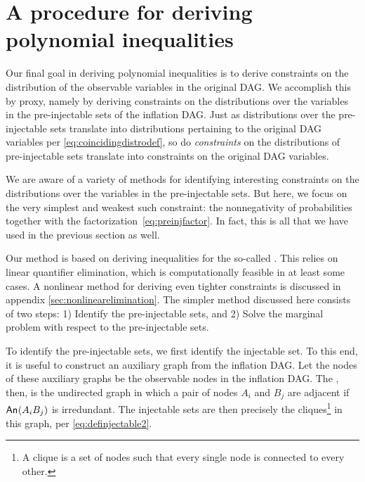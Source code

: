 \section{A procedure for deriving polynomial inequalities}
\label{sec:ineqs}


Our final goal in deriving polynomial inequalities is to derive constraints on the distribution of the observable variables in the original DAG. We accomplish this by proxy, namely by deriving constraints on the distributions over the variables in the pre-injectable sets of the inflation DAG. Just as distributions over the pre-injectable sets translate into distributions pertaining to the original DAG variables per \cref{eq:coincidingdistrodef}, so do \emph{constraints} on the distributions of pre-injectable sets translate into constraints on the original DAG variables.

We are aware of a variety of methods for identifying interesting constraints on the distributions over the variables in the pre-injectable sets. But here, we focus on the very simplest and weakest such constraint: the nonnegativity of probabilities together with the factorization~\cref{eq:preinjfactor}. In fact, this is all that we have used in the previous section as well.

Our method is based on deriving inequalities for the so-called . This relies on linear quantifier elimination, which is computationally feasible in at least some cases. A nonlinear method for deriving even tighter constraints is discussed in appendix \cref{sec:nonlinearelimination}. The simpler method discussed here consists of two steps: 1) Identify the pre-injectable sets, and 2) Solve the marginal problem with respect to the pre-injectable sets.


\label{step:findpreinjectable}\par\smallskip\nobreak

To identify the pre-injectable sets, we first identify the injectable set. To this end, it is useful to construct an auxiliary graph from the inflation DAG. Let the nodes of these auxiliary graphs be the observable nodes in the inflation DAG. The , then, is the undirected graph in which a pair of nodes $A_i$ and $B_j$ are adjacent if  ${\mathsf{An}_{}}\lparen A_i B_j\rparen$ is irredundant. The injectable sets are then precisely the cliques\footnote{A clique is a set of nodes such that every single node is connected to every other.} in this graph, per \cref{eq:definjectable2}. 

